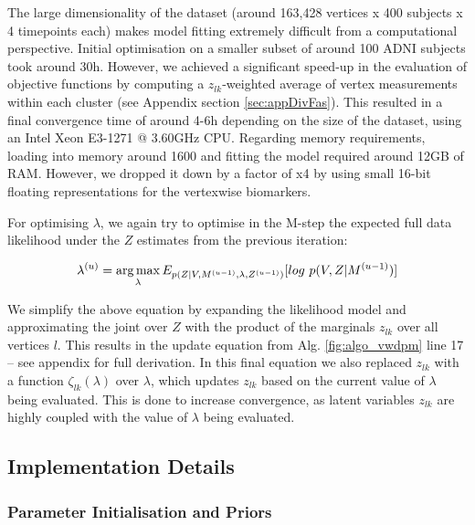 The large dimensionality of the dataset (around 163,428 vertices x 400 subjects x 4 timepoints each) makes model fitting extremely difficult from a computational perspective. Initial optimisation on a smaller subset of around 100 ADNI subjects took around 30h. However, we achieved a significant speed-up in the evaluation of objective functions by computing a $z_{lk}$-weighted average of vertex measurements within each cluster (see Appendix section \ref{sec:appDivFas}). This resulted in a final convergence time of around 4-6h depending on the size of the dataset, using an Intel Xeon E3-1271 @ 3.60GHz CPU. Regarding memory requirements, loading into memory around 1600 and fitting the model required around 12GB of RAM. However, we dropped it down by a factor of x4 by using small 16-bit floating representations for the vertexwise biomarkers.

For optimising $\lambda$, we again try to optimise in the M-step the expected full data likelihood under the $Z$ estimates from the previous iteration: 

\begin{equation}
\lambda^{(u)} = \argmax_{\lambda} E_{p(Z|V, M^{(u-1)}, \lambda, Z^{(u-1)})}[log\ p(V,Z|M^{(u-1)})]
\end{equation}

We simplify the above equation by expanding the likelihood model and approximating the joint over $Z$ with the product of the marginals $z_{lk}$ over all vertices $l$. This results in the update equation from Alg. \ref{fig:algo_vwdpm} line 17 -- see appendix for full derivation. In this final equation we also replaced $z_{lk}$ with a function $\zeta_{lk}(\lambda)$ over $\lambda$, which updates $z_{lk}$ based on the current value of $\lambda$ being evaluated. This is done to increase convergence, as latent variables $z_{lk}$ are highly coupled with the value of $\lambda$ being evaluated.

\subsection{Implementation Details}
\label{sec:diveImplem}

\subsubsection{Parameter Initialisation and Priors}

